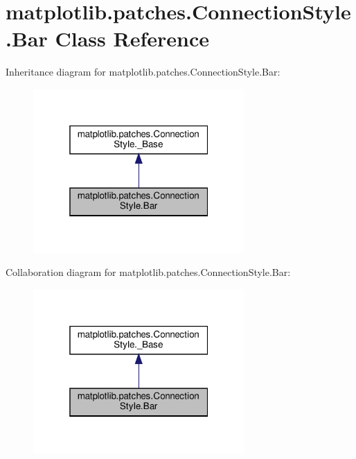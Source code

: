 \hypertarget{classmatplotlib_1_1patches_1_1ConnectionStyle_1_1Bar}{}\section{matplotlib.\+patches.\+Connection\+Style.\+Bar Class Reference}
\label{classmatplotlib_1_1patches_1_1ConnectionStyle_1_1Bar}


Inheritance diagram for matplotlib.\+patches.\+Connection\+Style.\+Bar\+:
\nopagebreak
\begin{figure}[H]
\begin{center}
\leavevmode
\includegraphics[width=229pt]{classmatplotlib_1_1patches_1_1ConnectionStyle_1_1Bar__inherit__graph}
\end{center}
\end{figure}


Collaboration diagram for matplotlib.\+patches.\+Connection\+Style.\+Bar\+:
\nopagebreak
\begin{figure}[H]
\begin{center}
\leavevmode
\includegraphics[width=229pt]{classmatplotlib_1_1patches_1_1ConnectionStyle_1_1Bar__coll__graph}
\end{center}
\end{figure}
